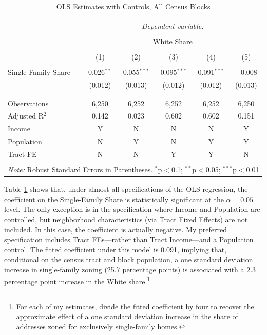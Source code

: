 \documentclass[11pt]{article}
\begin{document}
\begin{table}[!htbp] \centering 
  \caption{OLS Estimates with Controls, All Census Blocks} 
  \label{tab:OLS_controls} 
\begin{tabular}{@{\extracolsep{5pt}}lccccc} 
\\[-1.8ex]\hline 
\hline \\[-1.8ex] 
 & \multicolumn{5}{c}{\textit{Dependent variable:}} \\ 
\cline{2-6} 
\\[-1.8ex] & \multicolumn{5}{c}{White Share} \\ 
\\[-1.8ex] & (1) & (2) & (3) & (4) & (5)\\ 
\hline \\[-1.8ex] 
 Single Family Share & 0.026$^{**}$ & 0.055$^{***}$ & 0.095$^{***}$ & 0.091$^{***}$ & $-$0.008 \\ 
  & (0.012) & (0.013) & (0.012) & (0.012) & (0.013) \\ 
  & & & & & \\ 
\hline \\[-1.8ex] 
Observations & 6,250 & 6,252 & 6,252 & 6,252 & 6,250 \\ 
Adjusted R$^{2}$ & 0.142 & 0.023 & 0.602 & 0.602 & 0.151 \\ 
\hline
Income & Y & N & N & N & Y\\
Population & N & Y & N & Y & Y\\
Tract FE & N & N & Y & Y & N\\
\hline 
\hline \\[-1.8ex] 
\multicolumn{6}{l}{\textit{Note:} Robust Standard Errors in Parentheses. $^{*}$p$<$0.1; $^{**}$p$<$0.05; $^{***}$p$<$0.01} \\ 
\end{tabular} 
\end{table}


Table \ref{tab:OLS_controls} shows that, under almost all specifications of the OLS regression, the coefficient on the Single-Family Share is statistically significant at the $\alpha=0.05$ level. The only exception is in the specification where Income and Population are controlled, but neighborhood characteristics (via Tract Fixed Effects) are not included. In this case, the coefficient is actually negative. My preferred specification includes Tract FEs---rather than Tract Income---and a Population control. The fitted coefficient under this model is 0.091, implying that, conditional on the census tract and block population, a one standard deviation increase in single-family zoning (25.7 percentage points) is associated with a 2.3 percentage point increase in the White share.\footnote{For each of my estimates, divide the fitted coefficient by four to recover the approximate effect of a one standard deviation increase in the share of addresses zoned for exclusively single-family homes.}
\end{document}
